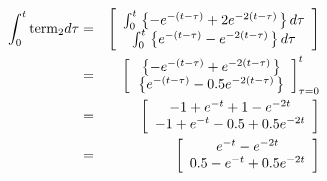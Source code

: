 \begin{eqnarray*}
	\int_0^t {{\rm{term}}_2 d\tau }  & = & \left[ {\begin{array}{*{20}c}
	   {\int_0^t {\left. {\left\{ { - e^{ - (t - \tau )}  + 2e^{ - 2(t - \tau )} } \right.} \right\}d\tau } }  \\
	   {\int_0^t {\left. {\left\{ {e^{ - (t - \tau )}  - e^{ - 2(t - \tau )} } \right.} \right\}d\tau } }  \\
	\end{array}} \right] \\
	& = & 
	  \left[ {\begin{array}{*{20}c}
	   {\left. {\left\{ { - e^{ - (t - \tau )}  + e^{ - 2(t - \tau )} } \right.} \right\}}  \\
	   {\left. {\left\{ {e^{ - (t - \tau )}  - 0.5e^{ - 2(t - \tau )} } \right.} \right\}}  \\
	\end{array}} \right]_{\tau  = 0}^t  \\ 
	 & = & \left[ {\begin{array}{*{20}c}
	   { - 1 + e^{ - t}  + 1 - e^{ - 2t} }  \\
	   { - 1 + e^{ - t}  - 0.5 + 0.5e^{ - 2t} }  \\
	\end{array}} \right] \\ 
	 &  = & \left[ {\begin{array}{*{20}c}
	   {e^{ - t}  - e^{ - 2t} }  \\
	   {0.5 - e^{ - t}  + 0.5e^{ - 2t} }  \\
	\end{array}} \right]
\end{eqnarray*}

